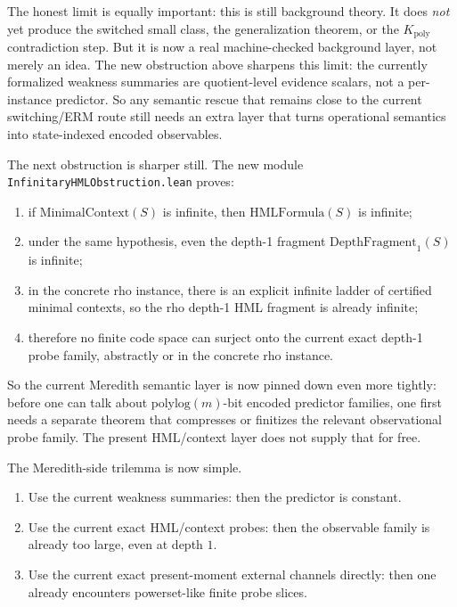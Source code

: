 \documentclass[11pt]{article}
\theoremstyle{remark}
\begin{document}
The honest limit is equally important: this is still background theory.  It does
\emph{not} yet produce the switched small class, the generalization theorem, or
the \(K_{\mathrm{poly}}\) contradiction step.  But it is now a real machine-checked
background layer, not merely an idea.
The new obstruction above sharpens this limit: the currently formalized
weakness summaries are quotient-level evidence scalars, not a per-instance
predictor.  So any semantic rescue that remains close to the
current switching/ERM route still needs an extra layer that turns operational
semantics into state-indexed encoded observables.

The next obstruction is sharper still.  The new module
\texttt{InfinitaryHMLObstruction.lean} proves:
\begin{enumerate}[leftmargin=1.5em]
  \item if \(\mathrm{MinimalContext}(S)\) is infinite, then \(\mathrm{HMLFormula}(S)\)
  is infinite;
  \item under the same hypothesis, even the depth-1 fragment
  \(\mathrm{DepthFragment}_1(S)\) is infinite;
  \item in the concrete rho instance, there is an explicit infinite ladder of
  certified minimal contexts, so the rho depth-1 HML fragment is already
  infinite;
  \item therefore no finite code space can surject onto the current exact
  depth-1 probe family, abstractly or in the concrete rho instance.
\end{enumerate}

So the current Meredith semantic layer is now pinned down even more tightly:
before one can talk about \(\mathrm{polylog}(m)\)-bit encoded predictor families,
one first needs a separate theorem that compresses or finitizes the relevant
observational probe family.  The present HML/context layer does not supply that
for free.

The Meredith-side trilemma is now simple.
\begin{enumerate}[leftmargin=1.5em]
  \item Use the current weakness summaries: then the predictor is constant.
  \item Use the current exact HML/context probes: then the observable family is
  already too large, even at depth \(1\).
  \item Use the current exact present-moment external channels directly: then one already
  encounters powerset-like finite probe slices.
\end{enumerate}
\end{document}
